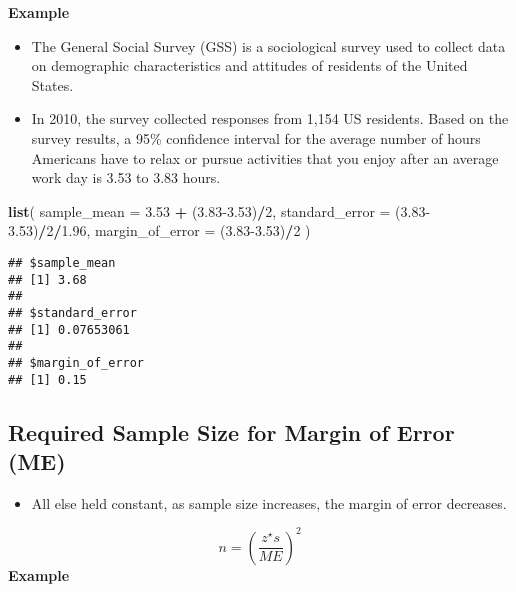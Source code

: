 \documentclass[]{book}
\newenvironment{Shaded}{\begin{snugshade}}{\end{snugshade}}
\newcommand{\DataTypeTok}[1]{\textcolor[rgb]{0.13,0.29,0.53}{#1}}
\newcommand{\DecValTok}[1]{\textcolor[rgb]{0.00,0.00,0.81}{#1}}
\newcommand{\FloatTok}[1]{\textcolor[rgb]{0.00,0.00,0.81}{#1}}
\newcommand{\KeywordTok}[1]{\textcolor[rgb]{0.13,0.29,0.53}{\textbf{#1}}}
\newcommand{\NormalTok}[1]{#1}
\newcommand{\OperatorTok}[1]{\textcolor[rgb]{0.81,0.36,0.00}{\textbf{#1}}}
\newcommand{\StringTok}[1]{\textcolor[rgb]{0.31,0.60,0.02}{#1}}
\providecommand{\tightlist}{%
  \setlength{\itemsep}{0pt}\setlength{\parskip}{0pt}}
\begin{document}
\textbf{Example}

\begin{itemize}
\tightlist
\item
  The General Social Survey (GSS) is a sociological survey used to collect data on demographic characteristics and attitudes of residents of the United States.
\item
  In 2010, the survey collected responses from 1,154 US residents. Based on the survey results, a 95\% confidence interval for the average number of hours Americans have to relax or pursue activities that you enjoy after an average work day is 3.53 to 3.83 hours.
\end{itemize}

\begin{Shaded}
\begin{Highlighting}[]
\KeywordTok{list}\NormalTok{(}
  \DataTypeTok{sample_mean =} \FloatTok{3.53} \OperatorTok{+}\StringTok{ }\NormalTok{(}\FloatTok{3.83-3.53}\NormalTok{)}\OperatorTok{/}\DecValTok{2}\NormalTok{,}
  \DataTypeTok{standard_error =}\NormalTok{ (}\FloatTok{3.83-3.53}\NormalTok{)}\OperatorTok{/}\DecValTok{2}\OperatorTok{/}\FloatTok{1.96}\NormalTok{,}
  \DataTypeTok{margin_of_error =}\NormalTok{ (}\FloatTok{3.83-3.53}\NormalTok{)}\OperatorTok{/}\DecValTok{2}
\NormalTok{)}
\end{Highlighting}
\end{Shaded}

\begin{verbatim}
## $sample_mean
## [1] 3.68
## 
## $standard_error
## [1] 0.07653061
## 
## $margin_of_error
## [1] 0.15
\end{verbatim}

\hypertarget{required-sample-size-for-margin-of-error-me}{%
\subsection*{Required Sample Size for Margin of Error (ME)}\label{required-sample-size-for-margin-of-error-me}}

\begin{itemize}
\tightlist
\item
  All else held constant, as sample size increases, the margin of error decreases.
\end{itemize}

\[ 
n = ( \frac{z^\star s}{ME} )^2
\]
\textbf{Example}
\end{document}
